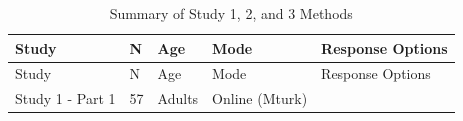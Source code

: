 \documentclass[man]{apa6}
\theoremstyle{definition}
\theoremstyle{definition}
\theoremstyle{definition}
\theoremstyle{remark}
\begin{document}
\begin{longtable}[]{@{}lllll@{}}
\caption{\label{tab:study3info} Summary of Study 1, 2, and 3
Methods}\tabularnewline
\toprule
\begin{minipage}[b]{0.19\columnwidth}\raggedright\strut
Study\strut
\end{minipage} & \begin{minipage}[b]{0.02\columnwidth}\raggedright\strut
N\strut
\end{minipage} & \begin{minipage}[b]{0.20\columnwidth}\raggedright\strut
Age\strut
\end{minipage} & \begin{minipage}[b]{0.11\columnwidth}\raggedright\strut
Mode\strut
\end{minipage} & \begin{minipage}[b]{0.32\columnwidth}\raggedright\strut
Response Options\strut
\end{minipage}\tabularnewline
\midrule
\endfirsthead
\toprule
\begin{minipage}[b]{0.19\columnwidth}\raggedright\strut
Study\strut
\end{minipage} & \begin{minipage}[b]{0.02\columnwidth}\raggedright\strut
N\strut
\end{minipage} & \begin{minipage}[b]{0.20\columnwidth}\raggedright\strut
Age\strut
\end{minipage} & \begin{minipage}[b]{0.11\columnwidth}\raggedright\strut
Mode\strut
\end{minipage} & \begin{minipage}[b]{0.32\columnwidth}\raggedright\strut
Response Options\strut
\end{minipage}\tabularnewline
\midrule
\endhead
\begin{minipage}[t]{0.19\columnwidth}\raggedright\strut
Study 1 - Part 1\strut
\end{minipage} & \begin{minipage}[t]{0.02\columnwidth}\raggedright\strut
57\strut
\end{minipage} & \begin{minipage}[t]{0.20\columnwidth}\raggedright\strut
Adults\strut
\end{minipage} & \begin{minipage}[t]{0.11\columnwidth}\raggedright\strut
Online (Mturk)\strut
\end{minipage} & \begin{minipage}[t]{0.32\columnwidth}\raggedright\strut

\end{minipage}
\end{longtable}
\end{document}
